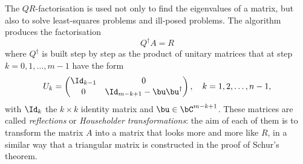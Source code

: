 The $QR$-factorisation is used not only to find the eigenvalues of a
matrix, but also to solve least-squares problems and ill-posed
problems.  The algorithm produces the factorisation
%
\begin{equation}
  Q^{\dagger} A = R
  \label{eq:Ev16}
\end{equation}
%
where $Q^{\dagger}$ is built step by step as the product of unitary
matrices that at step $k=0,1,\ldots,m-1$ have the form
%
\begin{equation}
  U_k =
  \begin{pmatrix}
    \Id_{k-1} & 0 \\ 0 & \Id_{m-k+1} - \bu \bu^{\dagger}
  \end{pmatrix},
  \quad k = 1,2, \ldots, n-1,
  \label{eq:Ev17}
\end{equation}
%
with $\Id_k$ the $k \times k$ identity matrix and $\bu \in
\bC^{m-k+1}$.  These matrices are called \textit{reflections} or
\textit{Householder transformations}: the aim of each of them is to
transform the matrix $A$ into a matrix that looks more and more like
$R$, in a similar way that a triangular matrix is constructed in the
proof of Schur's theorem.

